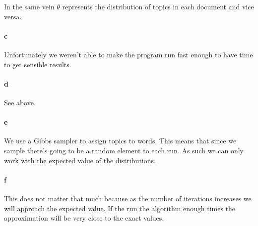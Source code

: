 \documentclass{article}
\begin{document}
In the same vein $\theta$ represents the distribution of topics in each
document and vice versa.

\paragraph{c}

Unfortunately we weren't able to make the program run fast enough to have time
to get sensible results.

\paragraph{d}

See above.

\paragraph{e}

We use a Gibbs sampler to assign topics to words. This means that since we
sample there's going to be a random element to each run. As such we can only
work with the expected value of the distributions.

\paragraph{f}

This does not matter that much because as the number of iterations increases we
will approach the expected value. If the run the algorithm enough times the
approximation will be very close to the exact values.
\end{document}
